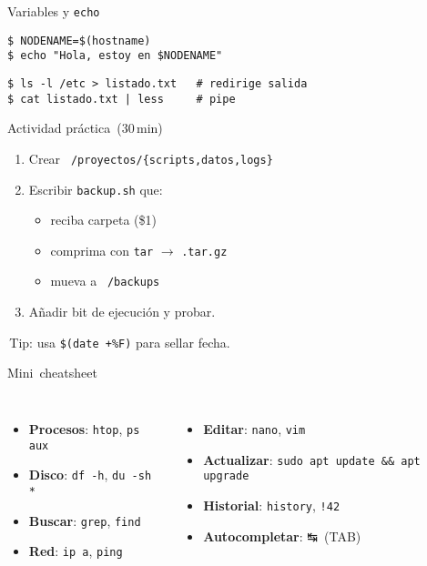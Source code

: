 \documentclass[aspectratio=169,professionalfonts]{beamer}
\begin{document}
\begin{frame}[fragile]{Variables y \texttt{echo}}
\begin{verbatim}
$ NODENAME=$(hostname)
$ echo "Hola, estoy en $NODENAME"
\end{verbatim}

\begin{verbatim}
$ ls -l /etc > listado.txt   # redirige salida
$ cat listado.txt | less     # pipe
\end{verbatim}
\end{frame}

\begin{frame}{Actividad práctica (30 min)}
\begin{enumerate}
  \item Crear \texttt{~/proyectos/\{scripts,datos,logs\}}
  \item Escribir \texttt{backup.sh} que:
    \begin{itemize}
      \item reciba carpeta (\$1)
      \item comprima con \texttt{tar} \(\to\) \texttt{.tar.gz}
      \item mueva a \texttt{~/backups}
    \end{itemize}
  \item Añadir bit de ejecución y probar.
\end{enumerate}

\small\faLightbulb\; Tip: usa \texttt{\$(date +\%F)} para sellar fecha.
\end{frame}

\begin{frame}[fragile]{Mini cheatsheet}
\begin{columns}[T,onlytextwidth]
\begin{itemize}
  \item \textbf{Procesos}: \texttt{htop}, \texttt{ps aux}
  \item \textbf{Disco}: \texttt{df -h}, \texttt{du -sh *}
  \item \textbf{Buscar}: \texttt{grep}, \texttt{find}
  \item \textbf{Red}: \texttt{ip a}, \texttt{ping}
\end{itemize}

\begin{itemize}
  \item \textbf{Editar}: \texttt{nano}, \texttt{vim}
  \item \textbf{Actualizar}: \texttt{sudo apt update && apt upgrade}
  \item \textbf{Historial}: \texttt{history}, \texttt{!42}
  \item \textbf{Autocompletar}: ↹ (TAB)
\end{itemize}
\end{columns}
\end{frame}
\end{document}
